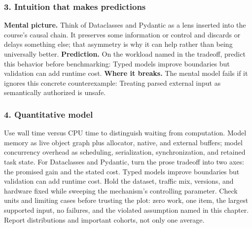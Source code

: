 \subsubsection*{3. Intuition that makes predictions}
\textbf{Mental picture.} Think of Dataclasses and Pydantic as a lens inserted into the course's causal chain. It preserves some information or control and discards or delays something else; that asymmetry is why it can help rather than being universally better.
\textbf{Prediction.} On the workload named in the tradeoff, predict this behavior before benchmarking: Typed models improve boundaries but validation can add runtime cost.
\textbf{Where it breaks.} The mental model fails if it ignores this concrete counterexample: Treating parsed external input as semantically authorized is unsafe.
\subsubsection*{4. Quantitative model}
Use wall time versus CPU time to distinguish waiting from computation. Model memory as live object graph plus allocator, native, and external buffers; model concurrency overhead as scheduling, serialization, synchronization, and retained task state.
For Dataclasses and Pydantic, turn the prose tradeoff into two axes: the promised gain and the stated cost. Typed models improve boundaries but validation can add runtime cost. Hold the dataset, traffic mix, versions, and hardware fixed while sweeping the mechanism's controlling parameter.
Check units and limiting cases before trusting the plot: zero work, one item, the largest supported input, no failures, and the violated assumption named in this chapter. Report distributions and important cohorts, not only one average.
